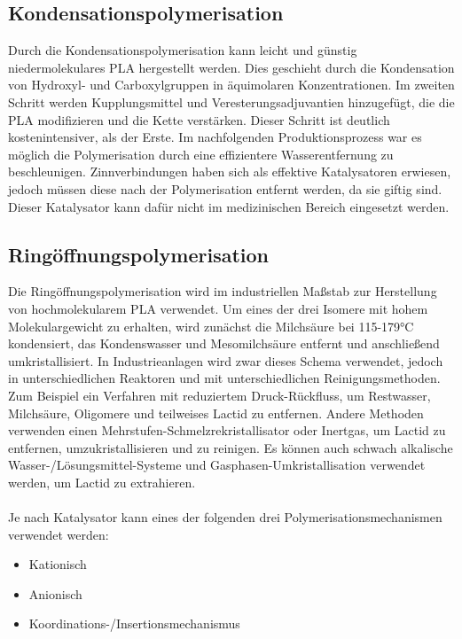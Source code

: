 \documentclass[10pt]{article}
\begin{document}
    \subsection{Kondensationspolymerisation}
    Durch die Kondensationspolymerisation kann leicht und günstig niedermolekulares PLA hergestellt werden.
    Dies geschieht durch die Kondensation von Hydroxyl- und Carboxylgruppen in äquimolaren Konzentrationen.
    Im zweiten Schritt werden Kupplungsmittel und Veresterungsadjuvantien hinzugefügt, die die PLA modifizieren und die Kette verstärken.
    Dieser Schritt ist deutlich kostenintensiver, als der Erste.
    Im nachfolgenden Produktionsprozess war es möglich die Polymerisation durch eine effizientere Wasserentfernung zu beschleunigen.
    Zinnverbindungen haben sich als effektive Katalysatoren erwiesen, jedoch müssen diese nach der Polymerisation entfernt werden, da sie giftig sind.
    Dieser Katalysator kann dafür nicht im medizinischen Bereich eingesetzt werden.

    \subsection{Ringöffnungspolymerisation}
    Die Ringöffnungspolymerisation wird im industriellen Maßstab zur Herstellung von hochmolekularem PLA verwendet.
    Um eines der drei Isomere mit hohem Molekulargewicht zu erhalten, wird zunächst die Milchsäure bei 115-179°C kondensiert, das Kondenswasser und Mesomilchsäure entfernt und anschließend umkristallisiert.
    In Industrieanlagen wird zwar dieses Schema verwendet, jedoch in unterschiedlichen Reaktoren und mit unterschiedlichen Reinigungsmethoden.
    Zum Beispiel ein Verfahren mit reduziertem Druck-Rückfluss, um Restwasser, Milchsäure, Oligomere und teilweises Lactid zu entfernen.
    Andere Methoden verwenden einen Mehrstufen-Schmelzrekristallisator oder Inertgas, um Lactid zu entfernen, umzukristallisieren und zu reinigen.
    Es können auch schwach alkalische Wasser-/Lösungsmittel-Systeme und Gasphasen-Umkristallisation verwendet werden, um Lactid zu extrahieren. \\ \\

    Je nach Katalysator kann eines der folgenden drei Polymerisationsmechanismen verwendet werden:

    \begin{itemize}
        \item Kationisch
        \item Anionisch
        \item Koordinations-/Insertionsmechanismus
    \end{itemize}
\end{document}
